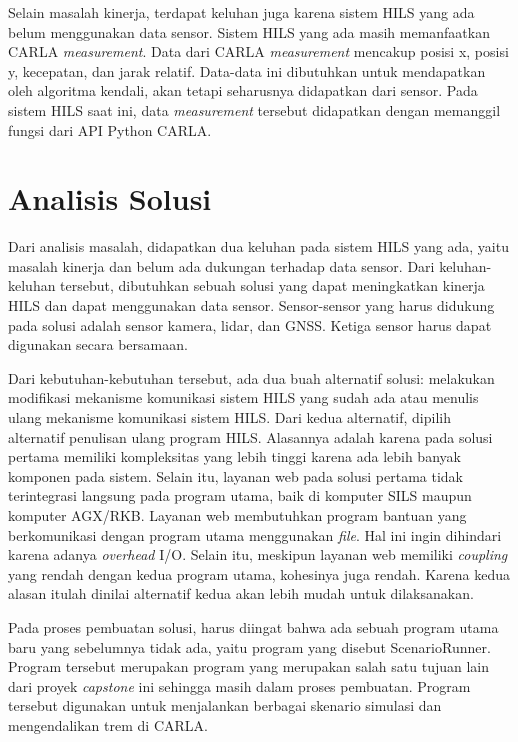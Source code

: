 Selain masalah kinerja, terdapat keluhan juga karena sistem HILS yang ada belum
menggunakan data sensor. Sistem HILS yang ada masih memanfaatkan CARLA
\textit{measurement}. Data dari CARLA \textit{measurement} mencakup posisi x,
posisi y, kecepatan, dan jarak relatif. Data-data ini dibutuhkan untuk
mendapatkan oleh algoritma kendali, akan tetapi seharusnya didapatkan dari
sensor. Pada sistem HILS saat ini, data \textit{measurement} tersebut didapatkan
dengan memanggil fungsi dari API Python CARLA.

\section{Analisis Solusi}

Dari analisis masalah, didapatkan dua keluhan pada sistem HILS yang ada, yaitu
masalah kinerja dan belum ada dukungan terhadap data sensor. Dari
keluhan-keluhan tersebut, dibutuhkan sebuah solusi yang dapat meningkatkan
kinerja HILS dan dapat menggunakan data sensor. Sensor-sensor yang harus
didukung pada solusi adalah sensor kamera, lidar, dan GNSS. Ketiga sensor harus
dapat digunakan secara bersamaan.

Dari kebutuhan-kebutuhan tersebut, ada dua buah alternatif solusi: melakukan
modifikasi mekanisme komunikasi sistem HILS yang sudah ada atau menulis ulang
mekanisme komunikasi sistem HILS. Dari kedua alternatif, dipilih alternatif
penulisan ulang program HILS. Alasannya adalah karena pada solusi pertama
memiliki kompleksitas yang lebih tinggi karena ada lebih banyak komponen pada
sistem. Selain itu, layanan web pada solusi pertama tidak terintegrasi langsung
pada program utama, baik di komputer SILS maupun komputer AGX/RKB. Layanan web
membutuhkan program bantuan yang berkomunikasi dengan program utama menggunakan
\textit{file}. Hal ini ingin dihindari karena adanya \textit{overhead} I/O.
Selain itu, meskipun layanan web memiliki \textit{coupling} yang rendah dengan
kedua program utama, kohesinya juga rendah. Karena kedua alasan itulah dinilai
alternatif kedua akan lebih mudah untuk dilaksanakan.

Pada proses pembuatan solusi, harus diingat bahwa ada sebuah program utama baru
yang sebelumnya tidak ada, yaitu program yang disebut ScenarioRunner. Program
tersebut merupakan program yang merupakan salah satu tujuan lain dari proyek
\textit{capstone} ini sehingga masih dalam proses pembuatan. Program tersebut
digunakan untuk menjalankan berbagai skenario simulasi dan mengendalikan trem di
CARLA.

